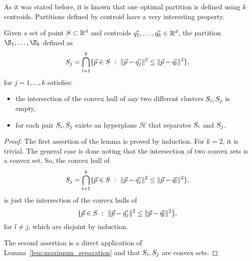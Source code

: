 \documentclass{article}
\newcommand{\cH}{\mathcal{H}}
\begin{document}
As it was stated before, it is known that one optimal partition is defined using
$k$ centroids. Partitions defined by centroid have a very interesting
property.
\begin{lemma}
  Given a set of point $S\subset \mathbb{R}^{d}$ and centroids
  $\vec{q_1},\ldots,\vec{q_k}\in\mathbb{R}^d$, the partition $\S_1,\ldots,
  \S_k$ defined as 
  \begin{equation*}
    \Set_j=\bigcap_{l=1}^{k}\{\vec{p}\in\Set\ :\ 
    \|\vec{p}-\vec{q_j}\|^2\le \|\vec{p}-\vec{q_l}\|^2\},
  \end{equation*}
  for $j = 1,\ldots, k$ satisfies:
  \begin{itemize}
  \item the intersection of the convex hull of any two different
    clusters $S_i,S_j$ is empty,
  \item for each pair $S_i, S_j$ exists an hyperplane $\cH$ that 
    separates $S_i$ and $S_j$.
  \end{itemize}
\end{lemma}
\begin{proof}
  The first assertion of the lemma is proved by induction. For $k=2$,
  it is trivial. The general case is done noting that the intersection
  of two convex sets is a convex set. So, the convex hull of 
  \begin{equation*}
    \Set_j=\bigcap_{l=1}^{k}\{\vec{p}\in\Set\ :\ 
    \|\vec{p}-\vec{q_j}\|^2\le \|\vec{p}-\vec{q_l}\|^2\},
  \end{equation*}
  is just the intersection of the convex hulls of 
  \begin{equation*}
    \{\vec{p}\in\Set\ :\ 
    \|\vec{p}-\vec{q_j}\|^2\le \|\vec{p}-\vec{q_l}\|^2\},
  \end{equation*}
  for $l\neq j$, which are disjoint by induction.

  The second assertion is a direct application of
  Lemma~\ref{lem:maximum_separation} and that $S_i, S_j$ are
  convex sets. 
\end{proof}




\end{document}
